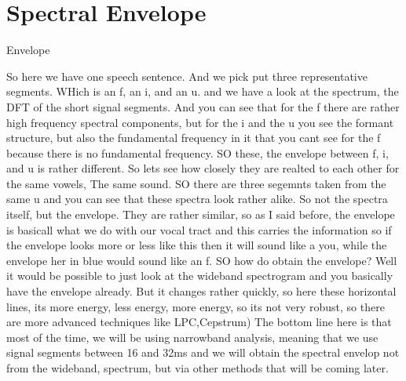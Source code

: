 \clearpage
\section{Spectral Envelope}
\label{Spectral Envelope}


Envelope

So here we have one speech sentence.  And we pick put three representative segments. WHich is an f, an i, and an u. and we have a look at the spectrum, the DFT of the short signal segments. And you can see that for the f there are rather high frequency spectral components, but for the i and the u you see the formant structure, but also the fundamental frequency in it that you cant see for the f because there is no fundamental frequency. SO these, the envelope between f, i, and u is rather different.  So lets see how closely they are realted to each other for the same vowels, The same sound.  SO there are three segemnts taken from the same u and you can see that these spectra look rather alike. So not the spectra itself, but the envelope. They are rather similar, so as I said before, the envelope is basicall what we do with our vocal tract and this carries the information so if the envelope looks more or less like this then it will sound like a you, while the envelope her in blue would sound like an f.  SO how do obtain the envelope?  Well it would be possible to just look at the wideband spectrogram and you basically have the envelope already.  But it changes rather quickly, so here  these horizontal lines, its more energy, less energy, more energy, so its not very robust, so there are more advanced techniques like LPC,Cepstrum)  The bottom line here is that most of the time, we will be using narrowband analysis, meaning that we use signal segments between 16 and 32ms and we will obtain the spectral envelop not from the wideband, spectrum, but via other methods that will be coming later.
